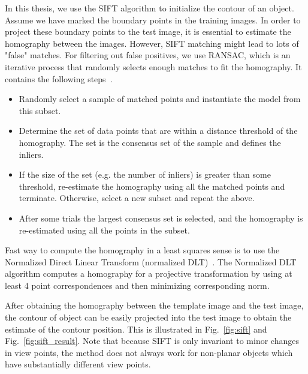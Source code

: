 
In this thesis, we use the SIFT algorithm to initialize the
contour of an object. Assume we have marked the boundary points in the
training images. In order to project these boundary points to the test
image, it is essential to estimate the homography between the
images. However, SIFT matching
might lead to lots of "false" matches. %
For filtering out false positives, we use RANSAC, which is an
iterative process that randomly selects enough matches to fit the
homography. It contains the following steps~\cite{fischler1981random}.

\begin{itemize}
\item  Randomly select a sample of matched points and instantiate the
  model from this subset.
\item Determine the set of data points that are within a distance
  threshold of the homography. The set is the consensus set of the sample
  and defines the inliers.
\item If the size of the set (e.g. the number of inliers) is greater
  than some threshold, re-estimate the homography using all the matched
  points and terminate. Otherwise, select a new subset and repeat the
  above.
\item After some trials the largest consensus set is selected, and the
  homography is re-estimated using all the points in the subset.
\end{itemize}
Fast way to compute the homography in a least squares sense is to use the Normalized
Direct Linear Transform (normalized
DLT)~\cite{hartley2003multiple}. The Normalized DLT algorithm computes
a homography for a projective transformation by using at least 4 point
correspondences and then minimizing corresponding norm.

After obtaining the homography between the template image and the
test image, the contour of object can be easily projected
into the test image to obtain the estimate of the contour
position. This is illustrated in Fig.~\ref{fig:sift} and
Fig.~\ref{fig:sift_result}. Note that because SIFT is only invariant
to minor changes in view points, the method does not always work for
non-planar objects which have substantially different view points.

